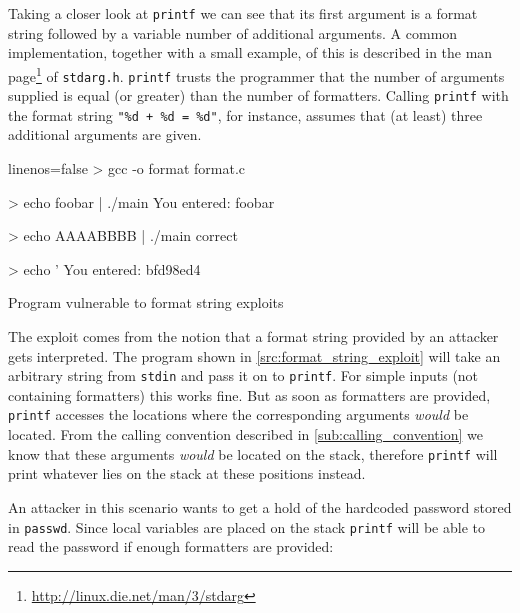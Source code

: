 \documentclass[article]{uibk}
\begin{document}
Taking a closer look at \texttt{printf} we can see that its first argument is a
format string followed by a variable number of additional arguments. A common
implementation, together with a small example, of this is described in the man
page\footnote{\url{http://linux.die.net/man/3/stdarg}} of \texttt{stdarg.h}.
\texttt{printf} trusts the programmer that the number of arguments supplied is
equal (or greater) than the number of formatters. Calling \texttt{printf} with
the format string \texttt{"\%d + \%d = \%d"}, for instance, assumes that (at
least) three additional arguments are given.

\begin{listing}[h!]
    \begin{minipage}[t]{0.4\textwidth}
    \end{minipage}\hfill
    \begin{minipage}[t]{0.5\textwidth}
        \begin{code*}{linenos=false}
            > gcc -o format format.c


            > echo foobar | ./main
            You entered:
            foobar


            > echo AAAABBBB | ./main
            correct


            > echo '%
            You entered:
            bfd98ed4
        \end{code*}
    \end{minipage}
    \caption{Program vulnerable to format string exploits}
    \label{src:format_string_exploit}
\end{listing}

The exploit comes from the notion that a format string provided by an attacker
gets interpreted. The program shown in \cref{src:format_string_exploit} will
take an arbitrary string from \texttt{stdin} and pass it on to \texttt{printf}.
For simple inputs (not containing formatters) this works fine. But as soon as
formatters are provided, \texttt{printf} accesses the locations where the
corresponding arguments \emph{would} be located. From the calling convention
described in \cref{sub:calling_convention} we know that these arguments
\emph{would} be located on the stack, therefore \texttt{printf} will print
whatever lies on the stack at these positions instead.

An attacker in this scenario wants to get a hold of the hardcoded password
stored in \texttt{passwd}. Since local variables are placed on the stack
\texttt{printf} will be able to read the password if enough formatters are
provided:
\end{document}
